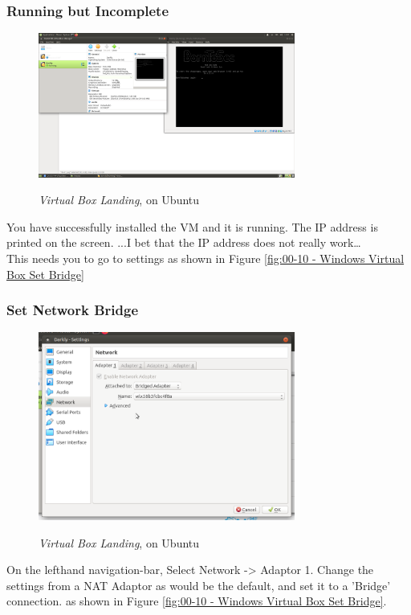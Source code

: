 \subsubsection{Running but Incomplete}
\begin{figure}[!htb]
    \centering
    \includegraphics[width=0.752\textwidth]{images/00-09.png}\\[0cm]  
    \caption[Virtual Box]{\emph{Virtual Box Landing}, on Ubuntu}
    \label{fig:00-09 - Windows Virtual Box Running not complete} 
\end{figure}
You have successfully installed the VM and it is running. The IP address is
printed on the screen. ...I bet that the IP address does not really work\dots\\

This needs you to go to settings as shown in Figure \vref{fig:00-10 - Windows Virtual Box Set Bridge}

\subsubsection{Set Network Bridge}

\begin{figure}[!htb]
    \centering
    \includegraphics[width=0.752\textwidth]{images/00-10.png}\\[0cm]  
    \caption[Virtual Box]{\emph{Virtual Box Landing}, on Ubuntu}
    \label{fig:00-10 - Windows Virtual Box Set Bridge} 
\end{figure}
On the lefthand navigation-bar, Select Network -> Adaptor 1.
Change the settings from a NAT Adaptor as would be the default, and set it
to a 'Bridge' connection. as shown in Figure \vref{fig:00-10 - Windows Virtual Box Set Bridge}.

